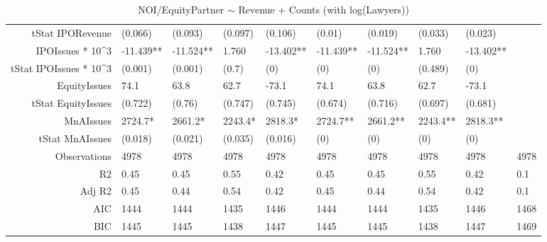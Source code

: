 \begin{table}[ht]
\begin{tabular}{rlllllllll}
  tStat IPORevenue & (0.066) & (0.093) & (0.097) & (0.106) & (0.01) & (0.019) & (0.033) & (0.023) &  \\ 
  IPOIssues * 10^3 & -11.439** & -11.524** & 1.760 & -13.402** & -11.439** & -11.524** & 1.760 & -13.402** &  \\ 
  tStat IPOIssues * 10^3 & (0.001) & (0.001) & (0.7) & (0) & (0) & (0) & (0.489) & (0) &  \\ 
  EquityIssues & 74.1 & 63.8 & 62.7 & -73.1 & 74.1 & 63.8 & 62.7 & -73.1 &  \\ 
  tStat EquityIssues & (0.722) & (0.76) & (0.747) & (0.745) & (0.674) & (0.716) & (0.697) & (0.681) &  \\ 
  MnAIssues & 2724.7* & 2661.2* & 2243.4* & 2818.3* & 2724.7** & 2661.2** & 2243.4** & 2818.3** &  \\ 
  tStat MnAIssues & (0.018) & (0.021) & (0.035) & (0.016) & (0) & (0) & (0) & (0) &  \\ 
  Observations & 4978 & 4978 & 4978 & 4978 & 4978 & 4978 & 4978 & 4978 & 4978 \\ 
  R2 & 0.45 & 0.45 & 0.55 & 0.42 & 0.45 & 0.45 & 0.55 & 0.42 & 0.1 \\ 
  Adj R2 & 0.45 & 0.44 & 0.54 & 0.42 & 0.45 & 0.44 & 0.54 & 0.42 & 0.1 \\ 
  AIC & 1444 & 1444 & 1435 & 1446 & 1444 & 1444 & 1435 & 1446 & 1468 \\ 
  BIC & 1445 & 1445 & 1438 & 1447 & 1445 & 1445 & 1438 & 1447 & 1469 \\ 
   \hline
\end{tabular}
\caption{NOI/EquityPartner $\sim$ Revenue + Counts (with log(Lawyers))} 
\end{table}
